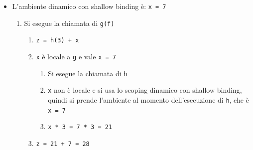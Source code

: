 \documentclass[a4paper]{article}
\begin{document}
\begin{example}
\begin{itemize}
    \item L'ambiente dinamico con shallow binding è: \texttt{x = 7}
      \begin{enumerate}
        \item Si esegue la chiamata di \texttt{g(f)}
          \begin{enumerate}
            \item \texttt{z = h(3) + x}
            \item \texttt{x} è locale a \texttt{g} e vale \texttt{x = 7}
              \begin{enumerate}
                \item Si esegue la chiamata di \texttt{h}
                \item \texttt{x} non è locale e si usa lo scoping dinamico con shallow binding,
                  quindi si prende l'ambiente al momento dell'esecuzione di \texttt{h}, che
                  è \texttt{x = 7}
                \item \texttt{x * 3 = 7 * 3 = 21}
              \end{enumerate}
            \item \texttt{z = 21 + 7 = 28}
          \end{enumerate}
      \end{enumerate}
  \end{itemize}
\end{example}
\end{document}
